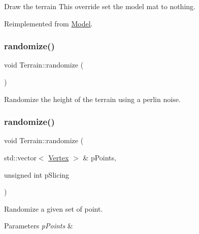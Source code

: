 Draw the terrain This override set the model mat to nothing. 



Reimplemented from \hyperlink{classModel_a125ff27c588f7f9acfc59c20dcc313b2}{Model}.

\mbox{\label{classTerrain_abc478a72ef7b4b9dae3911d1acee4c71}} 
\subsubsection{\texorpdfstring{randomize()}{randomize()}\hspace{0.1cm}{\footnotesize\ttfamily [1/2]}}
{\footnotesize\ttfamily void Terrain\+::randomize (\begin{DoxyParamCaption}{ }\end{DoxyParamCaption})}



Randomize the height of the terrain using a perlin noise. 

\mbox{\label{classTerrain_a9fa2515b7c84025c74c97af9b3fee30f}} 
\subsubsection{\texorpdfstring{randomize()}{randomize()}\hspace{0.1cm}{\footnotesize\ttfamily [2/2]}}
{\footnotesize\ttfamily void Terrain\+::randomize (\begin{DoxyParamCaption}\item[{std\+::vector$<$ \hyperlink{structVertex}{Vertex} $>$ \&}]{p\+Points,  }\item[{unsigned int}]{p\+Slicing }\end{DoxyParamCaption})\hspace{0.3cm}{\ttfamily [static]}}



Randomize a given set of point. 


\begin{DoxyParams}{Parameters}
{\em p\+Points} & \\
\hline
\end{DoxyParams}
\mbox{\label{classTerrain_afff1911e27bd05cf1da59799db595322}} 
